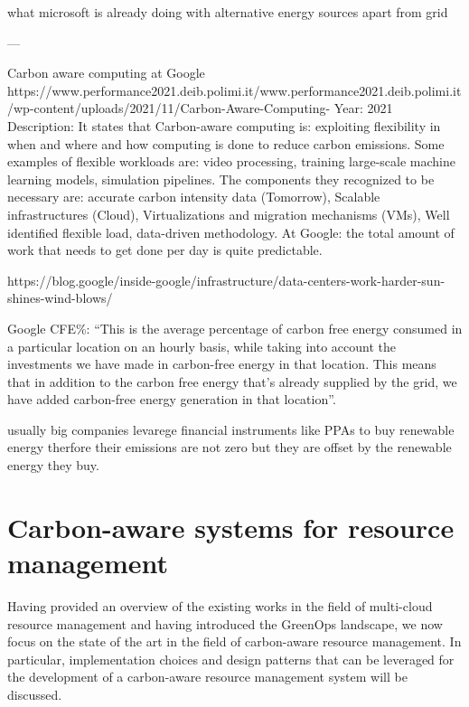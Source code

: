 what microsoft is already doing with alternative energy sources apart from grid


---

Carbon aware computing at Google
https://www.performance2021.deib.polimi.it/www.performance2021.deib.polimi.it/wp-content/uploads/2021/11/Carbon-Aware-Computing-%
Year: 2021
Description: 
It states that Carbon-aware computing is: exploiting flexibility in when and where and how computing is done to reduce carbon emissions.
Some examples of flexible workloads are: video processing, training large-scale machine learning models, simulation pipelines.
The components they recognized to be necessary are: accurate carbon intensity data (Tomorrow), Scalable infrastructures (Cloud), Virtualizations and migration mechanisms (VMs), Well identified flexible load, data-driven methodology.
At Google: the total amount of work that needs to get done per day is quite predictable.

https://blog.google/inside-google/infrastructure/data-centers-work-harder-sun-shines-wind-blows/

Google CFE\%: “This is the average percentage of carbon free energy consumed in a particular location on an hourly basis, while taking into account the investments we have made in carbon-free energy in that location. This means that in addition to the carbon free energy that's already supplied by the grid, we have added carbon-free energy generation in that location”.




usually big companies levarege financial instruments like PPAs to buy renewable energy therfore their emissions are not zero but they are offset by the renewable energy they buy.

\section{Carbon-aware systems for resource management}

Having provided an overview of the existing works in the field of multi-cloud resource management and having introduced the GreenOps landscape, we now focus on the state of the art in the field of carbon-aware resource management.
In particular, implementation choices and design patterns that can be leveraged for the development of a carbon-aware resource management system will be discussed.
\newline

